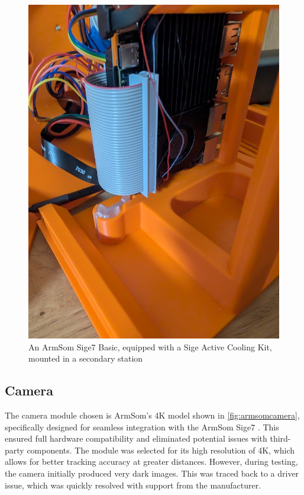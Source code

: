 \begin{figure}[H]
	\centering
	\includegraphics[width=1.0\linewidth]{figures/armsom_sige7}
	\caption{An ArmSom Sige7 Basic, equipped with a Sige Active Cooling Kit, mounted in a secondary station}
	\label{fig:armsomsige7}
\end{figure}

\subsection{Camera}

The camera module chosen is ArmSom's 4K model \cite{armsom_camera_module} shown in \autoref{fig:armsomcamera}, specifically designed for seamless integration with the ArmSom Sige7 \cite{armsom_sige7}. This ensured full hardware compatibility and eliminated potential issues with third-party components. The module was selected for its high resolution of 4K, which allows for better tracking accuracy at greater distances. However, during testing, the camera initially produced very dark images. This was traced back to a driver issue, which was quickly resolved with support from the manufacturer.


